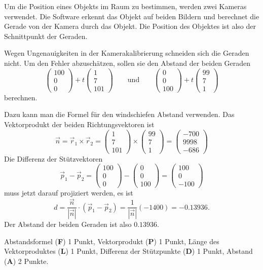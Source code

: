 Um die Position eines Objekts im Raum zu bestimmen, werden zwei Kameras
verwendet.
Die Software erkennt das Objekt auf beiden Bildern und berechnet
die Gerade von der Kamera durch das Objekt.
Die Position des Objektes ist also der Schnittpunkt der Geraden.

Wegen Ungenauigkeiten in der Kamerakalibrierung schneiden sich die Geraden
nicht. 
Um den Fehler abzuschätzen, sollen sie den Abstand der beiden Geraden
\[
\begin{pmatrix} 100\\0\\0 \end{pmatrix}
+
t\begin{pmatrix} 1\\7\\ 101\end{pmatrix}
\qquad\text{und}\qquad
\begin{pmatrix} 0\\0\\ 100 \end{pmatrix}
+
t\begin{pmatrix} 99\\7\\1 \end{pmatrix}
\]
berechnen.

\begin{loesung}
Dazu kann man die Formel für den windschiefen Abstand verwenden.
Das Vektorprodukt der beiden Richtungsvektoren ist
\[
\vec n
=
\vec r_1
\times
\vec r_2
=
\begin{pmatrix} 1\\7\\ 101\end{pmatrix}
\times
\begin{pmatrix} 99\\7\\1 \end{pmatrix}
=
\begin{pmatrix} -700\\9998\\-686 \end{pmatrix}
\]
Die Differenz der Stützvektoren
\[
\vec p_1-\vec p_2
=
\begin{pmatrix} 100\\0\\0 \end{pmatrix}
-
\begin{pmatrix} 0\\0\\ 100 \end{pmatrix}
=
\begin{pmatrix} 100\\0\\-100 \end{pmatrix}
\]
muss jetzt darauf projiziert werden, es ist
\[
d
=
\frac{\vec n}{|\vec n|}\cdot (\vec p_1-\vec p_2)
=
\frac{1}{|\vec n|}(-1400)=-0.13936.
\]
Der Abstand der beiden Geraden ist also $0.13936$.
\end{loesung}

\begin{bewertung}
Abstandsformel ({\bf F}) 1 Punkt,
Vektorprodukt ({\bf P}) 1 Punkt,
Länge des Vektorproduktes ({\bf L}) 1 Punkt,
Differenz der Stützpunkte ({\bf D}) 1 Punkt,
Abstand ({\bf A}) 2 Punkte.
\end{bewertung}

